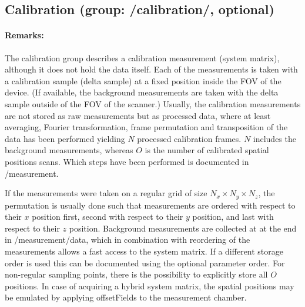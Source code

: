 \documentclass[landscape,a4paper]{article} %
\newcommand{\inlvar}[1]{{\ttfamily#1}}
\begin{document}
\newpage
\subsection{Calibration (group: \inlvar{/calibration/}, optional)}

\begin{multicols}{2}
\paragraph{Remarks:}
The calibration group describes a calibration measurement (system matrix), although it does not hold the data itself. Each of the measurements is taken with a calibration sample (delta sample) at a fixed position inside the FOV of the device. (If available, the background measurements are taken with the delta sample outside of the FOV of the scanner.) Usually, the calibration measurements are not stored as raw measurements but as processed data, where at least averaging, Fourier transformation, frame permutation and transposition of the data has been performed yielding $N$ processed calibration frames. $N$ includes the background measurements, whereas $O$ is the number of calibrated spatial positions scans. Which steps have been performed is documented in \inlvar{/measurement}.

If the measurements were taken on a regular grid of size $N_x \times N_y \times N_z$, the permutation is usually done such that measurements are ordered with respect to their $x$ position first, second with respect to their $y$ position, and last with respect to their $z$ position. Background measurements are collected at at the end in \inlvar{/measurement/data}, which in combination with reordering of the measurements allows a fast access to the system matrix. If a different storage order is used this can be documented using the optional parameter \inlvar{order}. For non-regular sampling points, there is the possibility to explicitly store all $O$ positions. In case of acquiring a hybrid system matrix, the spatial positions may be emulated by applying \inlvar{offsetFields} to the measurement chamber.
\end{multicols}
\end{document}

